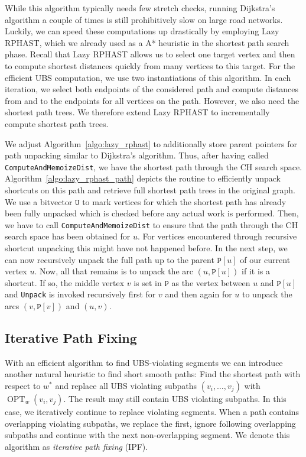\documentclass[a4paper,UKenglish,cleveref, autoref, thm-restate]{lipics-v2021}
\newcommand*{\shp}{\operatorname{OPT}}
\begin{document}
While this algorithm typically needs few stretch checks, running Dijkstra's algorithm a couple of times is still prohibitively slow on large road networks.
Luckily, we can speed these computations up drastically by employing Lazy RPHAST, which we already used as a A* heuristic in the shortest path search phase.
Recall that Lazy RPHAST allows us to select one target vertex and then to compute shortest distances quickly from many vertices to this target.
For the efficient UBS computation, we use two instantiations of this algorithm.
In each iteration, we select both endpoints of the considered path and compute distances from and to the endpoints for all vertices on the path.
However, we also need the shortest path trees.
We therefore extend Lazy RPHAST to incrementally compute shortest path trees.

We adjust Algorithm~\ref{algo:lazy_rphast} to additionally store parent pointers for path unpacking similar to Dijkstra's algorithm.
Thus, after having called \texttt{ComputeAndMemoizeDist}, we have the shortest path through the CH search space.
Algorithm~\ref{algo:lazy_rphast_path} depicts the routine to efficiently unpack shortcuts on this path and retrieve full shortest path trees in the original graph.
We use a bitvector $\mathtt{U}$ to mark vertices for which the shortest path has already been fully unpacked which is checked before any actual work is performed.
Then, we have to call \texttt{ComputeAndMemoizeDist} to ensure that the path through the CH search space has been obtained for $u$.
For vertices encountered through recursive shortcut unpacking this might have not happened before.
In the next step, we can now recursively unpack the full path up to the parent $\mathtt{P}[u]$ of our current vertex $u$.
Now, all that remains is to unpack the arc $(u, \mathtt{P}[u])$ if it is a shortcut.
If so, the middle vertex $v$ is set in $\mathtt{P}$ as the vertex between $u$ and $\mathtt{P}[u]$ and \texttt{Unpack} is invoked recursively first for $v$ and then again for $u$ to unpack the arcs $(v, \mathtt{P}[v])$ and $(u,v)$.

\subsection{Iterative Path Fixing}

With an efficient algorithm to find UBS-violating segments we can introduce another natural heuristic to find short smooth paths:
Find the shortest path with respect to $w^*$ and replace all UBS violating subpaths $(v_i,\dots,v_j)$ with $\shp_w(v_i, v_j)$.
The result may still contain UBS violating subpaths.
In this case, we iteratively continue to replace violating segments.
When a path contains overlapping violating subpaths, we replace the first, ignore following overlapping subpaths and continue with the next non-overlapping segment.
We denote this algorithm as \emph{iterative path fixing} (IPF).
\end{document}
